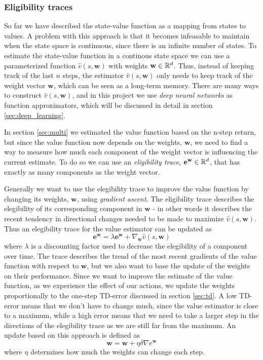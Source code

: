 \documentclass[11pt]{article}
\begin{document}
\subsubsection{Eligibility traces}\label{sec:et}

So far we have described the state-value function as a mapping from states to values.
A problem with this approach is that it becomes infeasable to maintain 
when the state space is continuous, since there is an infinite number of states.
To estimate the state-value function in a continous state space we can use a
parameterized function $\hat{v}(s, \mathbf{w})$ with weights $\mathbf{w} \in \mathbb{R}^d$.
Thus, instead of keeping track of the last $n$ steps, the estimator $\hat{v}(s, \mathbf{w})$
only needs to keep track of the weight vector $\mathbf{w}$, which can be seen as a long-term memory.
There are many ways to construct $\hat{v}(s, \mathbf{w})$, and in this project we use \textit{deep neural networks}
as function approximators, which will be discussed in detail in section \ref{sec:deep_learning}.

In section \ref{sec:multi} we estimated the value function based on the n-step return, but
since the value function now depends on the weights, $\mathbf{w}$, we need to find a way
to measure how much each component of the weight vector is influencing the
current estimate.
To do so we can use an \textit{eligibility trace}, $\mathbf{e}^{\mathbf{w}} \in \mathbb{R}^d$, that
has exactly as many components as the weight vector.

Generally we want to use the elegibility trace to improve the value function by
changing its weights, $\mathbf{w}$, using \textit{gradient ascent}.
The eligibility trace describes the elegibility of its corresponding component in $\mathbf{w}$
- in other words it describes the recent tendency in directional changes needed to be made
to maximize $\hat{v}(s, \mathbf{w})$.
Thus an elegibility trace for the value estimator can be updated as
\begin{equation}
    \mathbf{e}^\mathbf{w} = \lambda \mathbf{e}^\mathbf{w} + \nabla_\mathbf{w} \hat{v}(s, \mathbf{w})
\end{equation}
where $\lambda$ is a discounting factor used to decrease the elegibility of a component
over time.
The trace describes the trend of the most recent gradients of the value function
with respect to $\mathbf{w}$, but we also want to base the update of the weights on their
performance.
Since we want to improve the estimate of the value function, as we experience the effect of our actions,
we update the weights proportionally to the one-step TD-error discussed in section \ref{sec:td}.
A low TD-error means that we don't have to change much, since the value estimator is
close to a maximum, while a high error means that we need to take a larger step
in the directions of the elegibility trace as we are still far from the maximum.
An update based on this approach is defined as
\begin{equation}
    \mathbf{w} = \mathbf{w} + \eta \delta \nabla e^\mathbf{w}
\end{equation}
where $\eta$ determines how much the weights can change each step.
\end{document}
